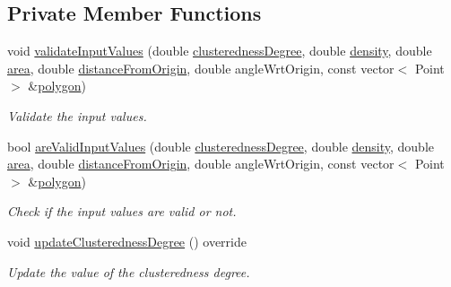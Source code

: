 \subsection*{Private Member Functions}
\begin{DoxyCompactItemize}
\item 
void \hyperlink{classmultiscale_1_1analysis_1_1Region_a517b46fd89696f44086aafb1a9526995}{validate\-Input\-Values} (double \hyperlink{classmultiscale_1_1analysis_1_1SpatialEntityPseudo3D_a22a84312e7c497cc5fbc4d8b41d8fd45}{clusteredness\-Degree}, double \hyperlink{classmultiscale_1_1analysis_1_1SpatialEntityPseudo3D_aedf807816f8c2f7cd961acfe0042fc56}{density}, double \hyperlink{classmultiscale_1_1analysis_1_1SpatialEntityPseudo3D_a1621d5b3ece663bf4c5501940e860292}{area}, double \hyperlink{classmultiscale_1_1analysis_1_1SpatialEntityPseudo3D_a056f67b90ed41c0e6dc4df31b71ad906}{distance\-From\-Origin}, double angle\-Wrt\-Origin, const vector$<$ Point $>$ \&\hyperlink{classmultiscale_1_1analysis_1_1Region_a40d1b47f30bb09c6a47521a968163b6d}{polygon})
\begin{DoxyCompactList}\small\item\em Validate the input values. \end{DoxyCompactList}\item 
bool \hyperlink{classmultiscale_1_1analysis_1_1Region_a6319de4734b11039dbb90dfdd3e30e31}{are\-Valid\-Input\-Values} (double \hyperlink{classmultiscale_1_1analysis_1_1SpatialEntityPseudo3D_a22a84312e7c497cc5fbc4d8b41d8fd45}{clusteredness\-Degree}, double \hyperlink{classmultiscale_1_1analysis_1_1SpatialEntityPseudo3D_aedf807816f8c2f7cd961acfe0042fc56}{density}, double \hyperlink{classmultiscale_1_1analysis_1_1SpatialEntityPseudo3D_a1621d5b3ece663bf4c5501940e860292}{area}, double \hyperlink{classmultiscale_1_1analysis_1_1SpatialEntityPseudo3D_a056f67b90ed41c0e6dc4df31b71ad906}{distance\-From\-Origin}, double angle\-Wrt\-Origin, const vector$<$ Point $>$ \&\hyperlink{classmultiscale_1_1analysis_1_1Region_a40d1b47f30bb09c6a47521a968163b6d}{polygon})
\begin{DoxyCompactList}\small\item\em Check if the input values are valid or not. \end{DoxyCompactList}\item 
void \hyperlink{classmultiscale_1_1analysis_1_1Region_a35c88944e2704571214b6e28dd657350}{update\-Clusteredness\-Degree} () override
\begin{DoxyCompactList}\small\item\em Update the value of the clusteredness degree. \end{DoxyCompactList}\item 

\end{DoxyCompactItemize}

